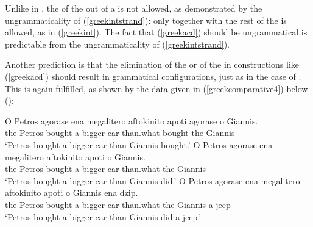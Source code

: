 \ea \label{petrosauto4}
\z
\z

Unlike in , the  of the  out of a  is not allowed, as demonstrated by the ungrammaticality of (\ref{greekintstrand}): only  together with the rest of the  is allowed, as in (\ref{greekint}). The fact that (\ref{greekacd}) should be ungrammatical is predictable from the ungrammaticality of (\ref{greekintstrand}).

Another prediction is that the elimination of the  or of the  in constructions like (\ref{greekacd}) should result in grammatical configurations, just as in the case of . This is again fulfilled, as shown by the  data given in (\ref{greekcomparative4}) below (\citealt[108, ex. 39]{kennedymerchant2000}):

\ea \label{greekcomparative4}
\ea \gll O Petros agorase ena megalitero aftokinito apoti agorase o Giannis. \label{greekellipsis}\\
the Petros bought a bigger car than.what bought the Giannis\\
\glt `Petros bought a bigger car than Giannis bought.'
\ex \gll O Petros agorase ena megalitero aftokinito apoti o Giannis. \label{greeksluicing}\\
the Petros bought a bigger car than.what the Giannis\\
\glt `Petros bought a bigger car than Giannis did.'
\ex \gll O Petros agorase ena megalitero aftokinito apoti o Giannis \underline{\hspace{0.5cm}} ena dzip. \label{greekgap}\\
the Petros bought a bigger car than.what the Giannis {} a jeep\\
\glt `Petros bought a bigger car than Giannis did a jeep.'
\z
\z


